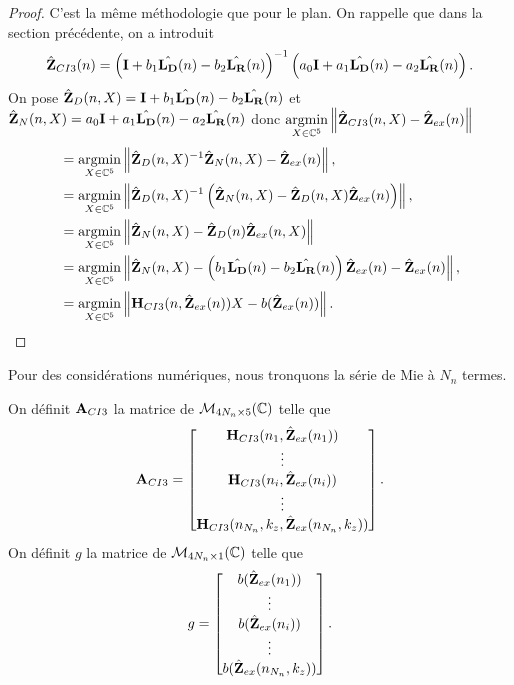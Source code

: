     \begin{proof}
      C'est la même méthodologie que pour le plan.
      On rappelle que dans la section précédente, on a introduit
      \begin{equation*}
        \hat{\mathbf{Z}}_{CI3}(n) = \left(\mathbf{I} + b_1 \hat{\mathbf{L_D}}(n) - b_2 \hat{\mathbf{L_R}}(n) \right)^{-1}\left(a_0 \mathbf{I} + a_1 {\hat{\mathbf{L_D}}(n)} - a_2 {\hat{\mathbf{L_R}}(n)}\right).
      \end{equation*}
      On pose \(\hat{\mathbf{Z}}_D(n,X) = \mathbf{I} + b_1 \hat{\mathbf{L_D}}(n) - b_2 \hat{\mathbf{L_R}}(n)\) et \(\hat{\mathbf{Z}}_N(n,X) = a_0 \mathbf{I} + a_1 {\hat{\mathbf{L_D}}(n)} - a_2 {\hat{\mathbf{L_R}}(n)}\) donc \({\underset{X\in\mathbb C^5}{\operatorname{argmin}}} \left\lVert\hat{\mathbf{Z}}_{CI3}(n,X) - \hat{\mathbf{Z}}_{ex}(n)\right\rVert\)
      \begin{align*}
      & = {\underset{X\in\mathbb C^5}{\operatorname{argmin}}} \left\lVert\hat{\mathbf{Z}}_D(n,X)^{-1}\hat{\mathbf{Z}}_N(n,X) - \hat{\mathbf{Z}}_{ex}(n) \right\rVert,
      \\
      &= {\underset{X\in\mathbb C^5}{\operatorname{argmin}}} \left\lVert\hat{\mathbf{Z}}_D(n,X)^{-1}\left(\hat{\mathbf{Z}}_N(n,X) - \hat{\mathbf{Z}}_D(n,X)\hat{\mathbf{Z}}_{ex}(n)\right) \right\rVert,
      \\
      &= {\underset{X\in\mathbb C^5}{\operatorname{argmin}}} \left\lVert\hat{\mathbf{Z}}_N(n,X) - \hat{\mathbf{Z}}_D(n)\hat{\mathbf{Z}}_{ex}(n,X)\right\rVert
      \\
      &= {\underset{X\in\mathbb C^5}{\operatorname{argmin}}} \left\lVert\hat{\mathbf{Z}}_N(n,X) - \left(b_1 \hat{\mathbf{L_D}}(n) - b_2 \hat{\mathbf{L_R}}(n)\right)\hat{\mathbf{Z}}_{ex}(n) - \hat{\mathbf{Z}}_{ex}(n) \right\rVert,
      \\
      &= {\underset{X\in\mathbb C^5}{\operatorname{argmin}}} \left\lVert\mathbf{H}_{CI3}(n,\hat{\mathbf{Z}}_{ex}(n))X - b(\hat{\mathbf{Z}}_{ex}(n))\right\rVert.
      \end{align*}
    \end{proof}

    Pour des considérations numériques, nous tronquons la série de Mie à \(N_{n}\) termes.
    \begin{defn}
      On définit \(\mathbf{A}_{CI3}\) la matrice de \(\mathcal{M}_{4N_{n}\times5}(\mathbb C)\) telle que
      \begin{equation*}
        \mathbf{A}_{CI3} = 
        \begin{bmatrix}
          \mathbf{H}_{CI3}(n_1,\hat{\mathbf{Z}}_{ex}(n_1))
          \\
          \vdots
          \\
          \mathbf{H}_{CI3}(n_i,\hat{\mathbf{Z}}_{ex}(n_i))
          \\
          \vdots
          \\
          \mathbf{H}_{CI3}(n_{N_n},k_{z},\hat{\mathbf{Z}}_{ex}(n_{N_n},k_{z}))
        \end{bmatrix}.
      \end{equation*}
      On définit \(g\) la matrice de \(\mathcal{M}_{4N_{n}\times1}(\mathbb C)\) telle que
      \begin{equation*}
        g = 
        \begin{bmatrix}
          b(\hat{\mathbf{Z}}_{ex}(n_1))
          \\
          \vdots
          \\
          b(\hat{\mathbf{Z}}_{ex}(n_i))
          \\
          \vdots
          \\
          b(\hat{\mathbf{Z}}_{ex}(n_{N_n},k_{z}))
        \end{bmatrix}.
      \end{equation*}
    \end{defn}

